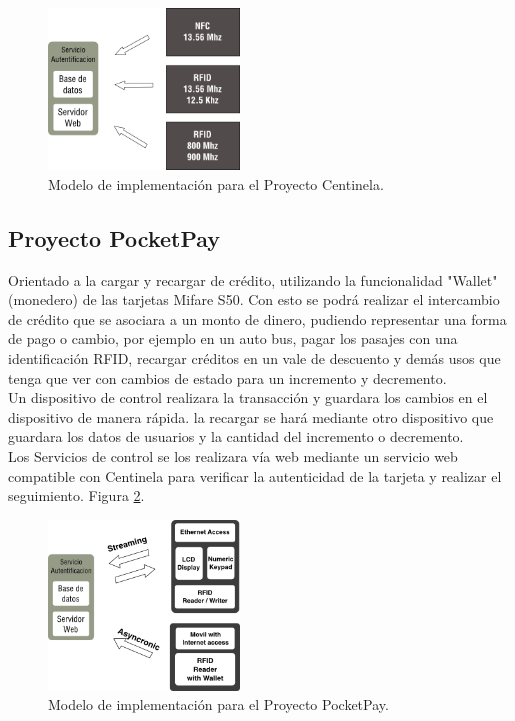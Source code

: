 \documentclass[11pt,twocolumn]{article}
\begin{document}
\begin{figure}[!h]
  \begin{center}
    \includegraphics[width=2in]{architect.png}
  \end{center}

  \caption{\small Modelo de implementaci\'on para el Proyecto Centinela.}
  \label{fig-centinela}
\end{figure}

\subsection{Proyecto PocketPay}

Orientado a la cargar y recargar de cr\'edito, utilizando la funcionalidad 
"Wallet" (monedero) de las tarjetas Mifare S50. Con esto se podr\'a realizar 
el intercambio de cr\'edito que se asociara a un monto de dinero, pudiendo 
representar una forma de pago o cambio, por ejemplo en un auto bus, pagar 
los pasajes con una identificaci\'on RFID, recargar cr\'editos en un vale 
de descuento y dem\'as usos que tenga que ver con cambios de estado para un 
incremento y decremento.\\

Un dispositivo de control realizara la transacci\'on y guardara los cambios en 
el dispositivo de manera r\'apida. la recargar se har\'a mediante  otro 
dispositivo que guardara los datos de usuarios y la cantidad del incremento 
o decremento.\\

Los Servicios de control se los realizara v\'ia web mediante un servicio web 
compatible con Centinela para verificar la autenticidad de la tarjeta y 
realizar el seguimiento. Figura \ref{fig-pocketpay}.\\



\begin{figure}[!h]
  \begin{center}
    \includegraphics[width=2in]{pocketpay.png}
  \end{center}

  \caption{\small Modelo de implementaci\'on para el Proyecto PocketPay.}
  \label{fig-pocketpay}
\end{figure}
\end{document}
